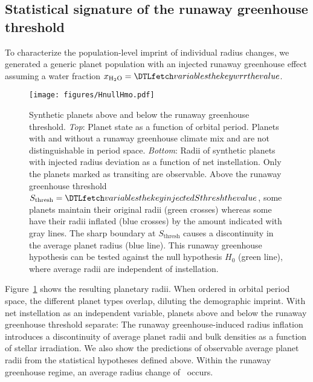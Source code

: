 \documentclass[twocolumn,twocolappendix]{aastex631}
\begin{document}
\subsection{Statistical signature of the runaway greenhouse threshold}\label{sec:res_signature}
To characterize the population-level imprint of individual radius changes, we generated a generic planet population with an injected runaway greenhouse effect assuming a water fraction $x_\mathrm{H_2O} = \var{wrr}$.
\begin{figure}
    \begin{centering}
        \texttt{[image: figures/HnullHmo.pdf]}
        \caption{Synthetic planets above and below the runaway greenhouse threshold.
        \textit{Top}: Planet state as a function of orbital period. Planets with and without a runaway greenhouse climate mix and are not distinguishable in period space.
        \textit{Bottom}: Radii of synthetic planets with injected radius deviation as a function of net instellation. Only the planets marked as transiting are observable.
            Above the runaway greenhouse threshold $S_\mathrm{thresh} = \var{injectedSthresh}$, some planets maintain their original radii (green crosses) whereas some have their radii inflated (blue crosses) by the amount indicated with gray lines.
        The sharp boundary at $S_\mathrm{thresh}$ causes a discontinuity in the average planet radius (blue line).
            This runaway greenhouse hypothesis can be tested against the null hypothesis $H_0$ (green line), where average radii are independent of instellation.}
        \label{fig:HnullHmo}
    \end{centering}
\end{figure}
Figure~\ref{fig:HnullHmo} shows the resulting planetary radii.
When ordered in orbital period space, the different planet types overlap, diluting the demographic imprint.
With net instellation as an independent variable, planets above and below the runaway greenhouse threshold separate: The runaway greenhouse-induced radius inflation introduces a discontinuity of average planet radii and bulk densities as a function of stellar irradiation.
We also show the predictions of observable average planet radii from the statistical hypotheses defined above.
Within the runaway greenhouse regime, an average radius change of \avgRadiusChange\ occurs.
\end{document}
